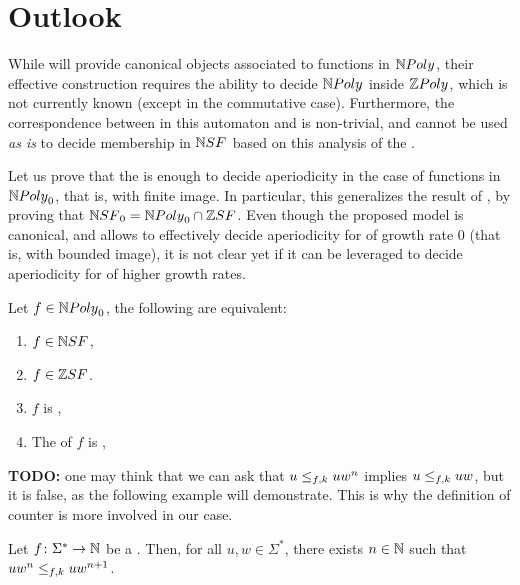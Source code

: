 \section{Outlook}
\label{sec:ccl}

While  will provide canonical objects associated
to functions in $\NPoly$, their effective construction requires the ability to
decide $\NPoly$ inside $\ZPoly$, which is not currently known (except in the
commutative case). Furthermore, the correspondence between  in
this automaton and  is non-trivial,
and cannot be used \emph{as is} to decide membership in $\NSF$
based on this analysis of the .

Let us prove that the  is enough to decide aperiodicity
in the case of functions in $\NPoly[0]$, that is, with finite image. In
particular, this generalizes the result of \cite{LOPEZ23b}, by proving that
$\NSF[0] = \NPoly[0] \cap \ZSF$. Even though the proposed model is canonical,
and allows to effectively decide aperiodicity for  of growth rate $0$ (that is, with bounded image), it is not clear
yet if it can be leveraged to decide aperiodicity for  of higher growth rates.

\begin{lemma}
    \label{aperiodic-iff-residual:lem}
    Let $f \in \NPoly[0]$, the following are equivalent:
    \begin{enumerate}
        \item $f \in \NSF$,
        \item $f \in \ZSF$.
        \item $f$ is ,
        \item The  of $f$ is ,
    \end{enumerate}
\end{lemma}

\textbf{TODO:} one may think that we can ask that $u \mathrel{\leq_{{f},{k}}} u w^n$
implies $u \mathrel{\leq_{{f},{k}}} uw$, but it is false, as the following example will
demonstrate. This is why the definition of counter is more involved in our
case.


\begin{lemma}
    \label{sf-no-periods-on-sequences:lemma}
    Let $f \colon \Sigma^* \to \mathbb{N}$ be a . Then,
    for all $u, w \in \Sigma^*$,
    there exists $n \in \mathbb{N}$ such that
    $u w^n \mathrel{\leq_{{f},{k}}} u w^{n+1}$.
\end{lemma}

